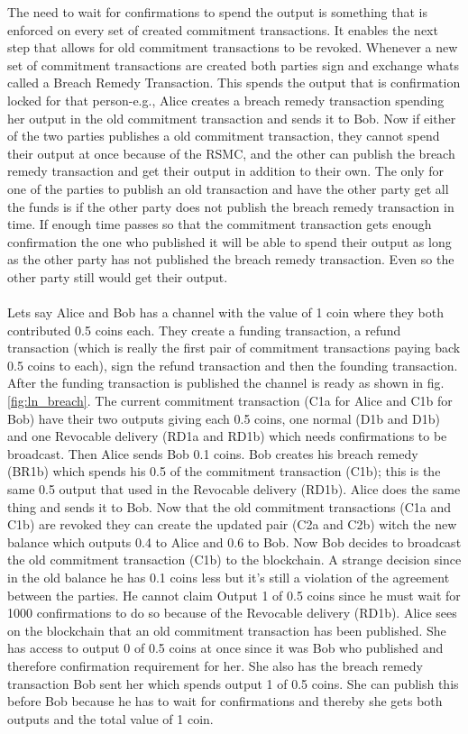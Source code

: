 \documentclass[informationsecurity]{gucmasterproject}
\begin{document}
The need to wait for confirmations to spend the output is something that is enforced on every set of created commitment transactions. It enables the next step that allows for old commitment transactions to be revoked. Whenever a new set of commitment transactions are created both parties sign and exchange whats called a Breach Remedy Transaction. This spends the output that is confirmation locked for that person-e.g., Alice creates a breach remedy transaction spending her output in the old commitment transaction and sends it to Bob. Now if either of the two parties publishes a old commitment transaction, they cannot spend their output at once because of the RSMC, and the other can publish the breach remedy transaction and get their output in addition to their own. The only for one of the parties to publish an old transaction and have the other party get all the funds is if the other party does not publish the breach remedy transaction in time. If enough time passes so that the commitment transaction gets enough confirmation the one who published it will be able to spend their output as long as the other party has not published the breach remedy transaction. Even so the other party still would get their output.

\paragraph{}
Lets say Alice and Bob has a channel with the value of 1 coin where they both contributed 0.5 coins each. They create a funding transaction, a refund transaction (which is really the first pair of commitment transactions paying back 0.5 coins to each), sign the refund transaction and then the founding transaction. After the funding transaction is published the channel is ready as shown in fig.\ref{fig:ln_breach}. The current commitment transaction (C1a for Alice and C1b for Bob) have their two outputs giving each 0.5 coins, one normal (D1b and D1b)   and one Revocable delivery (RD1a and RD1b) which needs confirmations to be broadcast. Then Alice sends Bob 0.1 coins. Bob creates his breach remedy (BR1b) which spends his 0.5 of the commitment transaction (C1b); this is the same 0.5 output that used in the Revocable delivery (RD1b).
Alice does the same thing and sends it to Bob. Now that the old commitment transactions (C1a and C1b) are revoked they can create the updated pair (C2a and C2b) witch the new balance which outputs 0.4 to Alice and 0.6 to Bob. Now Bob decides to broadcast the old commitment transaction (C1b) to the blockchain. A strange decision since in the old balance he has 0.1 coins less but it's still a violation of the agreement between the parties. 
He cannot claim Output 1 of 0.5 coins since he must wait for 1000 confirmations to do so because of the Revocable delivery (RD1b).
Alice sees on the blockchain that an old commitment transaction has been published. She has access to output 0 of 0.5 coins at once since it was Bob who published and therefore confirmation requirement for her. She also has the breach remedy transaction Bob sent her which spends output 1 of 0.5 coins. She can publish this before Bob because he has to wait for confirmations and thereby she gets both outputs and the total value of 1 coin.
\end{document}
